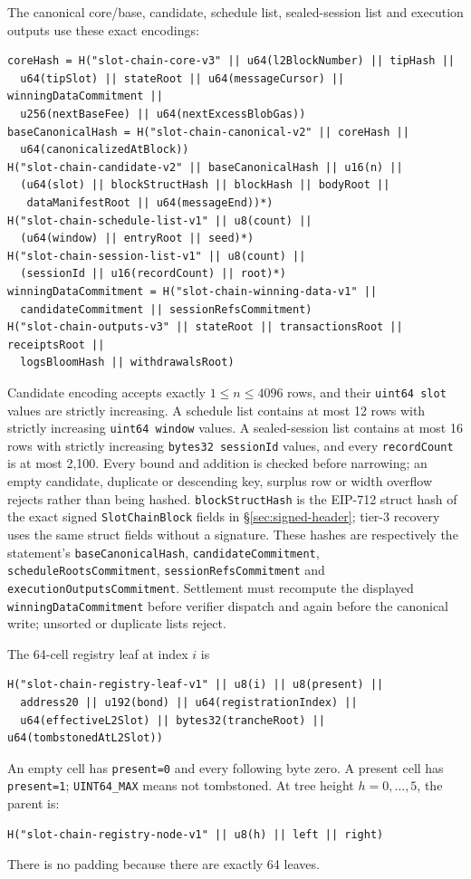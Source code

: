 \documentclass[a4paper,11pt]{article}
\newcommand{\code}[1]{\nolinkurl{#1}}
\begin{document}
The canonical core/base, candidate, schedule list, sealed-session list and execution
outputs use these exact encodings:
\begin{verbatim}
coreHash = H("slot-chain-core-v3" || u64(l2BlockNumber) || tipHash ||
  u64(tipSlot) || stateRoot || u64(messageCursor) || winningDataCommitment ||
  u256(nextBaseFee) || u64(nextExcessBlobGas))
baseCanonicalHash = H("slot-chain-canonical-v2" || coreHash ||
  u64(canonicalizedAtBlock))
H("slot-chain-candidate-v2" || baseCanonicalHash || u16(n) ||
  (u64(slot) || blockStructHash || blockHash || bodyRoot ||
   dataManifestRoot || u64(messageEnd))*)
H("slot-chain-schedule-list-v1" || u8(count) ||
  (u64(window) || entryRoot || seed)*)
H("slot-chain-session-list-v1" || u8(count) ||
  (sessionId || u16(recordCount) || root)*)
winningDataCommitment = H("slot-chain-winning-data-v1" ||
  candidateCommitment || sessionRefsCommitment)
H("slot-chain-outputs-v3" || stateRoot || transactionsRoot || receiptsRoot ||
  logsBloomHash || withdrawalsRoot)
\end{verbatim}
Candidate encoding accepts exactly $1\le n\le4096$ rows, and their
\code{uint64 slot} values are strictly increasing.  A schedule list contains
at most 12 rows with strictly increasing \code{uint64 window} values.  A
sealed-session list contains at most 16 rows with strictly increasing
\code{bytes32 sessionId} values, and every \code{recordCount} is at most 2,100.
Every bound and addition is checked before narrowing; an empty candidate,
duplicate or descending key, surplus row or width overflow rejects rather than
being hashed.  \code{blockStructHash} is the EIP-712 struct hash of the exact signed
\code{SlotChainBlock} fields in \S\ref{sec:signed-header}; tier-3 recovery uses
the same struct fields without a signature.  These hashes are respectively the statement's
\code{baseCanonicalHash}, \code{candidateCommitment},
\code{scheduleRootsCommitment}, \code{sessionRefsCommitment} and
\code{executionOutputsCommitment}.  Settlement must recompute the displayed
\code{winningDataCommitment} before verifier dispatch and again before the
canonical write; unsorted or duplicate lists reject.

The 64-cell registry leaf at index $i$ is
\begin{verbatim}
H("slot-chain-registry-leaf-v1" || u8(i) || u8(present) ||
  address20 || u192(bond) || u64(registrationIndex) ||
  u64(effectiveL2Slot) || bytes32(trancheRoot) || u64(tombstonedAtL2Slot))
\end{verbatim}
An empty cell has \code{present=0} and every following byte zero.  A present
cell has \code{present=1}; \code{UINT64_MAX} means not tombstoned.  At tree
height $h=0,\ldots,5$, the parent is:
\begin{verbatim}
H("slot-chain-registry-node-v1" || u8(h) || left || right)
\end{verbatim}
There is no padding because there are exactly 64 leaves.
\end{document}
